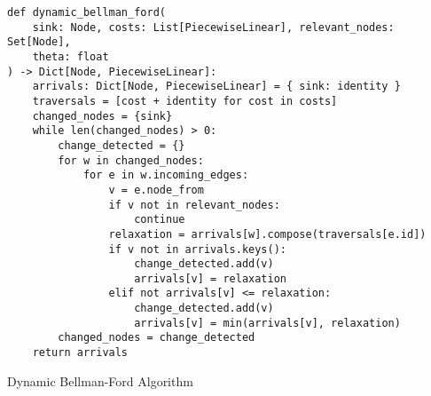 \begin{algorithm}
    \begin{verbatim}
def dynamic_bellman_ford(
    sink: Node, costs: List[PiecewiseLinear], relevant_nodes: Set[Node],
    theta: float
) -> Dict[Node, PiecewiseLinear]:
    arrivals: Dict[Node, PiecewiseLinear] = { sink: identity }
    traversals = [cost + identity for cost in costs]
    changed_nodes = {sink}
    while len(changed_nodes) > 0:
        change_detected = {}
        for w in changed_nodes:
            for e in w.incoming_edges:
                v = e.node_from
                if v not in relevant_nodes:
                    continue
                relaxation = arrivals[w].compose(traversals[e.id])
                if v not in arrivals.keys():
                    change_detected.add(v)
                    arrivals[v] = relaxation
                elif not arrivals[v] <= relaxation:
                    change_detected.add(v)
                    arrivals[v] = min(arrivals[v], relaxation)
        changed_nodes = change_detected
    return arrivals
    \end{verbatim}
    \caption{Dynamic Bellman-Ford Algorithm}
    \label{alg:dynamic-bellman-ford}
\end{algorithm}

